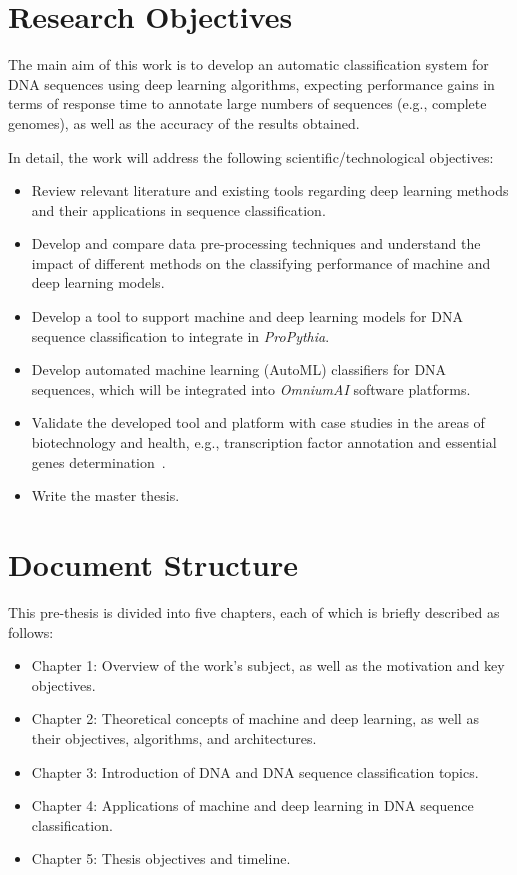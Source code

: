 \section{Research Objectives} \label{sec:research_objectives}

The main aim of this work is to develop an automatic classification system for DNA sequences using deep learning algorithms, expecting performance gains in terms of response time to annotate large numbers of sequences (e.g., complete genomes), as well as the accuracy of the results obtained. 

In detail, the work will address the following scientific/technological objectives:

\begin{itemize}
    \item Review relevant literature and existing tools regarding deep learning methods and their applications in sequence classification.
    \item Develop and compare data pre-processing techniques and understand the impact of different methods on the classifying performance of machine and deep learning models.
    \item Develop a tool to support machine and deep learning models for DNA sequence classification to integrate in \textit{ProPythia}.
    \item Develop automated machine learning (AutoML) classifiers for DNA sequences, which will be integrated into \textit{OmniumAI} software platforms.
    \item Validate the developed tool and platform with case studies in the areas of biotechnology and health, e.g., transcription factor annotation and essential genes determination~\cite{Zhang2020DeepHE:Learning,Quang2016DanQ:Sequences,Novakovsky2021BiologicallyPrediction}.
    \item Write the master thesis.
\end{itemize} 


\section{Document Structure} \label{sec:document_structure}

This pre-thesis is divided into five chapters, each of which is briefly described as follows:

\begin{itemize}
    \item Chapter 1: Overview of the work's subject, as well as the motivation and key objectives.
    \item Chapter 2: Theoretical concepts of machine and deep learning, as well as their objectives, algorithms, and architectures. 
    \item Chapter 3: Introduction of DNA and DNA sequence classification topics.
    \item Chapter 4: Applications of machine and deep learning in DNA sequence classification.
    \item Chapter 5: Thesis objectives and timeline. 
\end{itemize}